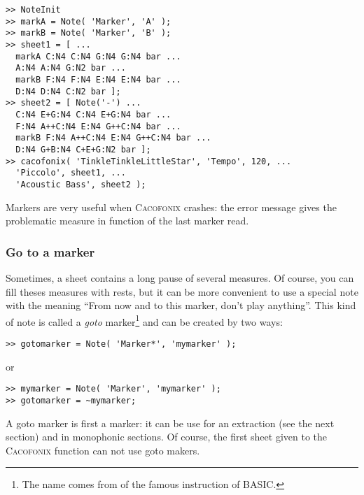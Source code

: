 \documentclass{article}
\newcommand{\cacofonix}{\textsc{Cacofonix}\xspace}
\begin{document}

\begin{lstlisting}
>> NoteInit
>> markA = Note( 'Marker', 'A' );
>> markB = Note( 'Marker', 'B' );
>> sheet1 = [ ...
  markA C:N4 C:N4 G:N4 G:N4 bar ...
  A:N4 A:N4 G:N2 bar ...
  markB F:N4 F:N4 E:N4 E:N4 bar ...
  D:N4 D:N4 C:N2 bar ];
>> sheet2 = [ Note('-') ...
  C:N4 E+G:N4 C:N4 E+G:N4 bar ...
  F:N4 A++C:N4 E:N4 G++C:N4 bar ...
  markB F:N4 A++C:N4 E:N4 G++C:N4 bar ...
  D:N4 G+B:N4 C+E+G:N2 bar ];
>> cacofonix( 'TinkleTinkleLittleStar', 'Tempo', 120, ...
  'Piccolo', sheet1, ...
  'Acoustic Bass', sheet2 );
\end{lstlisting}

Markers are very useful when \cacofonix crashes: the error message gives the problematic measure in function of the last marker read.

\subsubsection{Go to a marker}
\label{sec:Goto}

Sometimes, a sheet contains a long pause of several measures. Of course, you can fill theses measures with rests, but it can be more convenient to use a special note with the meaning ``From now and to this marker, don't play anything''. This kind of note is called a \emph{goto} marker\footnote{The name comes from of the famous instruction of BASIC.} and can be created by two ways:
\begin{lstlisting}
>> gotomarker = Note( 'Marker*', 'mymarker' );
\end{lstlisting}
or
\begin{lstlisting}
>> mymarker = Note( 'Marker', 'mymarker' );
>> gotomarker = ~mymarker;
\end{lstlisting}

A goto marker is first a marker: it can be use for an extraction (see the next section) and in monophonic sections. Of course, the first sheet given to the \cacofonix function can not use goto makers.

\end{document}
